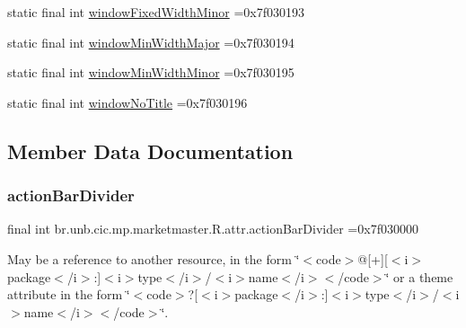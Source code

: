 \begin{DoxyCompactItemize}
\item 
static final int \mbox{\hyperlink{classbr_1_1unb_1_1cic_1_1mp_1_1marketmaster_1_1R_1_1attr_a5510b93ddb7f73a1188b964d69beb3a0}{window\+Fixed\+Width\+Minor}} =0x7f030193
\item 
static final int \mbox{\hyperlink{classbr_1_1unb_1_1cic_1_1mp_1_1marketmaster_1_1R_1_1attr_afbc16aec3c1c9c3902471effcc75155e}{window\+Min\+Width\+Major}} =0x7f030194
\item 
static final int \mbox{\hyperlink{classbr_1_1unb_1_1cic_1_1mp_1_1marketmaster_1_1R_1_1attr_a9b75a5f8d3c75a8240b49984a51c5eff}{window\+Min\+Width\+Minor}} =0x7f030195
\item 
static final int \mbox{\hyperlink{classbr_1_1unb_1_1cic_1_1mp_1_1marketmaster_1_1R_1_1attr_a2f0b822528d2323664e66c4091b94d92}{window\+No\+Title}} =0x7f030196
\end{DoxyCompactItemize}


\subsection{Member Data Documentation}
\mbox{\label{classbr_1_1unb_1_1cic_1_1mp_1_1marketmaster_1_1R_1_1attr_a360c52778a66bcc3ecb4746f567b7b0e}} 
\subsubsection{\texorpdfstring{action\+Bar\+Divider}{actionBarDivider}}
{\footnotesize\ttfamily final int br.\+unb.\+cic.\+mp.\+marketmaster.\+R.\+attr.\+action\+Bar\+Divider =0x7f030000\hspace{0.3cm}{\ttfamily [static]}}

May be a reference to another resource, in the form \char`\"{}$<$code$>$@\mbox{[}+\mbox{]}\mbox{[}$<$i$>$package$<$/i$>$\+:\mbox{]}$<$i$>$type$<$/i$>$/$<$i$>$name$<$/i$>$$<$/code$>$\char`\"{} or a theme attribute in the form \char`\"{}$<$code$>$?\mbox{[}$<$i$>$package$<$/i$>$\+:\mbox{]}$<$i$>$type$<$/i$>$/$<$i$>$name$<$/i$>$$<$/code$>$\char`\"{}. \mbox{\label{classbr_1_1unb_1_1cic_1_1mp_1_1marketmaster_1_1R_1_1attr_a4fbe5768f945353e5eb600b38512f417}} 
